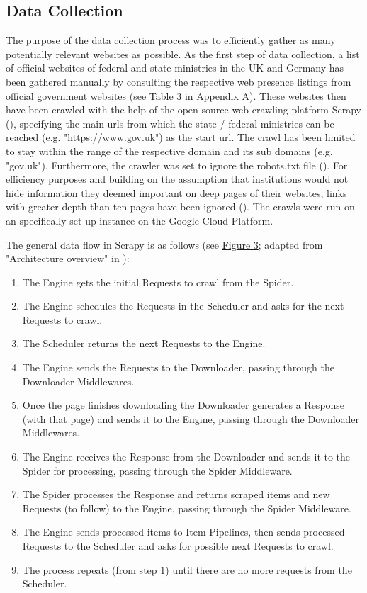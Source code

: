 \subsection{Data Collection}
The purpose of the data collection process was to efficiently gather as many potentially relevant websites as possible. As the first step of data collection, a list of official websites of federal and state ministries in the UK and Germany has been gathered manually by consulting the respective web presence listings from official government websites (see Table 3 in \hyperref[Appendix A]{Appendix A}). These websites then have been crawled with the help of the open-source web-crawling platform Scrapy (\cite{Kouzis-Loukas2016}), specifying the main urls from which the state / federal ministries can be reached (e.g. "https://www.gov.uk") as the start url. The crawl has been limited to stay within the range of the respective domain and its sub domains (e.g. "gov.uk"). Furthermore, the crawler was set to ignore the robots.txt file (\cite{Sun2007}). For efficiency purposes and building on the assumption that institutions would not hide information they deemed important on deep pages of their websites, links with greater depth than ten pages have been ignored (\cite{Scrapy2018, Wang2019}). The crawls were run on an specifically set up instance on the Google Cloud Platform.\par
The general data flow in Scrapy is as follows (see \hyperref[fig:Scrapy Architecture]{Figure 3}; adapted from "Architecture overview" in \cite{Scrapy2018}):
\begin{enumerate}
    \setlength\itemsep{0.001em}
        \item The Engine gets the initial Requests to crawl from the Spider.
        \item The Engine schedules the Requests in the Scheduler and asks for the next Requests to crawl.
        \item The Scheduler returns the next Requests to the Engine.
        \item The Engine sends the Requests to the Downloader, passing through the Downloader Middlewares.
        \item Once the page finishes downloading the Downloader generates a Response (with that page) and sends it to the Engine, passing through the Downloader Middlewares.
        \item The Engine receives the Response from the Downloader and sends it to the Spider for processing, passing through the Spider Middleware.
        \item The Spider processes the Response and returns scraped items and new Requests (to follow) to the Engine, passing through the Spider Middleware.
        \item The Engine sends processed items to Item Pipelines, then sends processed Requests to the Scheduler and asks for possible next Requests to crawl.
        \item The process repeats (from step 1) until there are no more requests from the Scheduler.
\end{enumerate}\par 
